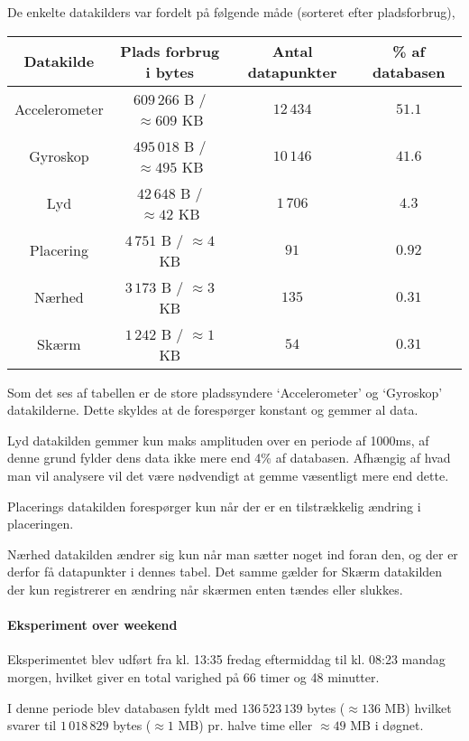 De enkelte datakilders var fordelt på følgende måde (sorteret efter pladsforbrug),

\begin{tabular}{|c|c|c|c|}
	\hline Datakilde		& Plads forbrug i bytes				& Antal datapunkter  & \% af databasen \\
	\hline Accelerometer 	& $609\,266$ B / $\approx609$ KB	& $12\,434$ 		 & $51.1$ \\ 
	\hline Gyroskop 		& $495\,018$ B / $\approx495$ KB	& $10\,146$ 		 & $41.6$\\ 
	\hline Lyd 				& $42\,648$ B / $\approx42$ KB		& $1\,706$ 			 & $4.3$ \\ 
	\hline Placering 		& $4\,751$ B / $\approx4$ KB		& $91$ 				 & $0.92$ \\ 
	\hline Nærhed    		& $3\,173$ B / $\approx3$ KB		& $135$ 			 & $0.31$ \\ 
	\hline Skærm 			& $1\,242$ B / $\approx1$	KB		& $54$				 & $0.31$ \\ 
	\hline 
\end{tabular} 

Som det ses af tabellen er de store pladssyndere `Accelerometer' og `Gyroskop' datakilderne.
Dette skyldes at de forespørger konstant og gemmer al data.

Lyd datakilden gemmer kun maks amplituden over en periode af 1000ms, af denne grund fylder dens data ikke mere end 4\% af databasen.
Afhængig af hvad man vil analysere vil det være nødvendigt at gemme væsentligt mere end dette.

Placerings datakilden forespørger kun når der er en tilstrækkelig ændring i placeringen.

Nærhed datakilden ændrer sig kun når man sætter noget ind foran den, og der er derfor få datapunkter i dennes tabel.
Det samme gælder for Skærm datakilden der kun registrerer en ændring når skærmen enten tændes eller slukkes.	

\paragraph{Eksperiment over weekend}
Eksperimentet blev udført fra kl. 13:35 fredag eftermiddag til kl. 08:23 mandag morgen, hvilket giver en total varighed på 66 timer og 48 minutter.

I denne periode blev databasen fyldt med  $136\,523\,139$ bytes ($\approx136$ MB) hvilket svarer til $1\,018\,829$ bytes ($\approx1$ MB) pr. halve time eller $\approx49$ MB i døgnet.

